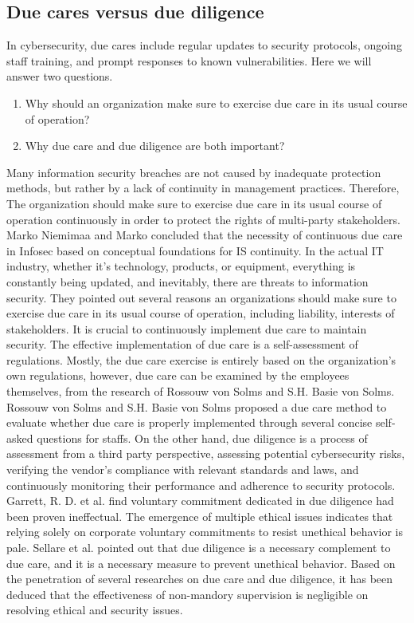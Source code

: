 \documentclass[
10pt, %
a4paper, %
oneside, %
headinclude,footinclude, %
BCOR5mm, %
]{scrartcl}
\begin{document}
\subsection{Due cares versus due diligence}
In cybersecurity, due cares include regular updates to security protocols, ongoing staff training, and prompt responses to known vulnerabilities.
Here we will answer two questions.
\begin{enumerate}[noitemsep]
    \item Why should an organization make sure to exercise due care in its usual course of operation?
    \item Why due care and due diligence are both important?
\end{enumerate}
Many information security breaches are not caused by inadequate protection methods, but rather by a lack of continuity in management practices.
Therefore, The organization should make sure to exercise due care in its usual course of operation continuously in order to protect the rights of multi-party stakeholders.
Marko Niemimaa and Marko concluded that the necessity of continuous due care in Infosec based on conceptual foundations for IS continuity\cite{niemimaa2017information}.
In the actual IT industry, whether it's technology, products, or equipment, everything is constantly being updated, and inevitably, there are threats to information security. 
They pointed out several reasons an organizations should make sure to exercise due care in its usual course of operation, including liability, interests of stakeholders.
It is crucial to continuously implement due care to maintain security.
The effective implementation of due care is a self-assessment of regulations.
Mostly, the due care exercise is entirely based on the organization's own regulations, however, due care can be examined by the employees themselves, from the research of Rossouw von Solms and S.H. Basie von Solms.
Rossouw von Solms and S.H. Basie von Solms proposed a due care method to evaluate whether due care is properly implemented through several concise self-asked questions for staffs\cite{von2006information}. 
On the other hand, due diligence is a process of assessment from a third party perspective, assessing potential cybersecurity risks, verifying the vendor’s compliance with relevant standards and laws, and continuously monitoring their performance and adherence to security protocols.
Garrett, R. D. et al. find voluntary commitment dedicated in due diligence had been proven ineffectual\cite{garrett2019criteria}.
The emergence of multiple ethical issues indicates that relying solely on corporate voluntary commitments to resist unethical behavior is pale.
Sellare et al. pointed out that due diligence is a necessary complement to due care, and it is a necessary measure to prevent unethical behavior\cite{sellare2022six}.
Based on the penetration of several researches on due care and due diligence, it has been deduced that the effectiveness of non-mandory supervision is negligible on resolving ethical and security issues.
\end{document}
